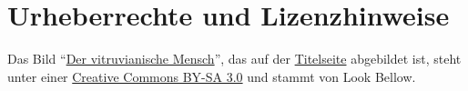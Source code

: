 \documentclass[12pt,a4paper,ngerman,numbers=noenddot,toc=listof]{scrreprt}
\begin{document}
\thispagestyle{empty}

\newpage\printEpigraphPage
{}
\tableofcontents	%
\listoffigures		%
%

\setcounter{headpages}{\value{page}}\newpage{}











\setcounter{sectionsV}{\value{section}}		%
\appendix	%


\section*{Urheberrechte und Lizenzhinweise}
Das Bild \enquote{\href{\URLTitlepageBG}{Der vitruvianische Mensch}},
das auf der \hyperref[titlepage]{Titelseite} abgebildet ist, steht unter einer
\href{http://creativecommons.org/licenses/by-sa/3.0/deed.de}{Creative Commons BY-SA 3.0}
und stammt von Look Bellow.

\vfill
\printURLlong
\printlicense
\printendsignature
\end{document}
